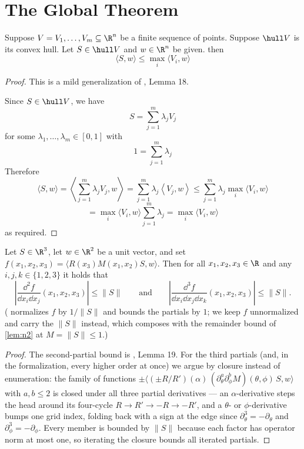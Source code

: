 \chapter{The Global Theorem}

\begin{lemma} \label{lem:hullscalarprod}
\leanok
{}
Suppose $V = V_1, \ldots, V_m \subseteq \R^n$ be a finite sequence of points. Suppose $\hull V$ is its convex hull.
Let $S \in \hull V$ and $w \in \R^n$ be given. then
    \[
        \langle S ,w \rangle \leq \max_{i} \langle V_i ,w\rangle
    \]
\end{lemma}

\begin{proof}
\leanok
This is a mild generalization of \cite{polyhedron.without.rupert}, Lemma 18.

Since $S \in \hull V$, we have
\[ S = \sum_{j=1}^m \lambda_j V_j \]
for some $\lambda_1,\ldots,\lambda_m \in [0,1]$ with
\[ 1 = \sum_{j=1}^m \lambda_j  \]
Therefore
\[
\langle S ,w \rangle = \left\langle  \sum_{j=1}^m \lambda_j V_j ,w \right\rangle
=  \sum_{j=1}^m \lambda_j \left\langle   V_j ,w \right\rangle
\le   \sum_{j=1}^m \lambda_j \max_{i} \langle V_i ,w\rangle
\]
\[
=  \max_{i} \langle V_i ,w\rangle \sum_{j=1}^m \lambda_j
=  \max_{i} \langle V_i ,w\rangle
\]
as required.
\end{proof}


\begin{lemma} \label{lem:leq1}
\leanok
    Let $S \in \R^3$, let $w \in \R^2$ be a unit vector, and set $f(x_1,x_2,x_3) = \langle R(x_3) M(x_1,x_2)S,w \rangle$. Then for all $x_1,x_2,x_3 \in \R$ and any $i,j,k \in \{1,2,3\}$ it holds that
    \[
        \left|\frac{\dd^2 f}{\dd x_i \dd x_j}(x_1,x_2,x_3)\right|\leq \|S\|
        \qquad\text{and}\qquad
        \left|\frac{\dd^3 f}{\dd x_i \dd x_j \dd x_k}(x_1,x_2,x_3)\right|\leq \|S\|.
    \]
    (\cite{polyhedron.without.rupert} normalizes $f$ by $1/\|S\|$ and bounds the
    partials by $1$; we keep $f$ unnormalized and carry the $\|S\|$ instead,
    which composes with the remainder bound of \cref{lem:n2} at $M = \|S\| \leq 1$.)
\end{lemma}

\begin{proof}\leanok
The second-partial bound is \cite{polyhedron.without.rupert}, Lemma 19.  For
the third partials (and, in the formalization, every higher order at once) we
argue by closure instead of enumeration: the family of functions
$\pm \langle (\pm R/R')(\alpha)\, (\partial_\theta^a \partial_\phi^b
M)(\theta,\phi)\, S, w\rangle$ with $a, b \le 2$ is closed under all three
partial derivatives --- an $\alpha$-derivative steps the head around its
four-cycle $R \to R' \to -R \to -R'$, and a $\theta$- or $\phi$-derivative
bumps one grid index, folding back with a sign at the edge since
$\partial_\theta^3 = -\partial_\theta$ and
$\partial_\phi^3 = -\partial_\phi$.  Every member is bounded by $\|S\|$
because each factor has operator norm at most one, so iterating the closure
bounds all iterated partials.
\end{proof}


